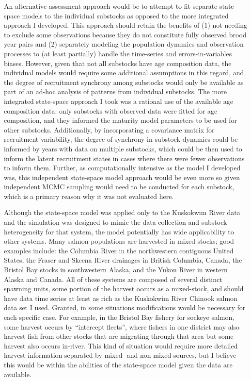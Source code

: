 \documentclass[12pt,]{book}
\theoremstyle{definition}
\theoremstyle{definition}
\theoremstyle{definition}
\theoremstyle{remark}
\begin{document}
An alternative assessment approach would be to attempt to fit separate
state-space models to the individual substocks as opposed to the more
integrated approach I developed. This approach should retain the
benefits of (1) not needing to exclude some observations because they do
not constitute fully observed brood year pairs and (2) separately
modeling the population dynamics and observation processes to (at least
partially) handle the time-series and errors-in-variables biases.
However, given that not all substocks have age composition data, the
individual models would require some additional assumptions in this
regard, and the degree of recruitment synchrony among substocks would
only be available as part of an ad-hoc analysis of patterns from
individual substocks. The more integrated state-space approach I took
was a rational use of the available age composition data: only substocks
with observed data were fitted for age composition, and they informed
the maturity model parameters to be used for other substocks.
Additionally, by incorporating a covariance matrix for recruitment
variability, the degree of synchrony in substock dynamics could be
informed by years with data on multiple substocks, which could be then
used to inform the latent recruitment states in cases where there were
fewer observations to inform them. Further, as computationally intensive
as the model I developed was, this independent state-space model
approach would be even more so given independent MCMC sampling would
need to be conducted for each substock, which is a primary reason why it
was not evaluated here.

Although the state-space model was applied only to the Kuskokwim River
data and the simulation was designed to mimic the data collection and
substock heterogeneity for that system, the model potentially has wide
applicability to other systems. Many salmon populations are harvested in
mixed stocks; good examples include: the Columbia River in the
northwestern contiguous United States, the Fraser and Skeena River
drainages in British Columbia, Canada, the Bristol Bay stocks in
southwestern Alaska, and the Yukon River in western Alaska and Canada.
All of these systems are composed of several distinct spawning units,
some portion of the harvest occurs as a mixed-stock, and should have
data time series at least as rich as the Kuskokwim River Chinook salmon
data set I used. Granted, in some situations modifications would be
necessary for each specific case. For example, in the Bristol Bay
fishery for sockeye salmon, some harvest occurs by ``intercept fleets'',
where fishers in one district may also harvest fish from other stocks
that are migrating through that area but some harvest also occurs
in-river. This kind of situation would require more detailed harvest
information separated by mixed- and non-mixed sources, but I believe
this would be within the abilities of the state-space model given the
data are available.
\end{document}
